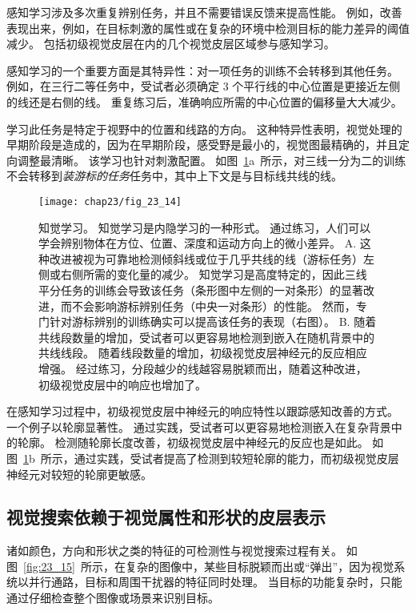 感知学习涉及多次重复辨别任务，并且不需要错误反馈来提高性能。
例如，改善表现出来，例如，在目标刺激的属性或在复杂的环境中检测目标的能力差异的阈值减少。
包括初级视觉皮层在内的几个视觉皮层区域参与感知学习。


感知学习的一个重要方面是其特异性：对一项任务的训练不会转移到其他任务。
例如，在三行二等任务中，受试者必须确定 3 个平行线的中心位置是更接近左侧的线还是右侧的线。
重复练习后，准确响应所需的中心位置的偏移量大大减少。


学习此任务是特定于视野中的位置和线路的方向。
这种特异性表明，视觉处理的早期阶段是造成的，因为在早期阶段，感受野是最小的，视觉图最精确的，并且定向调整最清晰。
该学习也针对刺激配置。
如图~\ref{fig:23_14}a~所示，对三线一分为二的训练不会转移到\textit{装游标的任务}任务中，其中上下文是与目标线共线的线。


\begin{figure}[htbp]
	\centering
	\texttt{[image: chap23/fig\_23\_14]}
	\caption{知觉学习。
		知觉学习是内隐学习的一种形式。
		通过练习，人们可以学会辨别物体在方位、位置、深度和运动方向上的微小差异。
		A. 这种改进被视为可靠地检测倾斜线或位于几乎共线的线（游标任务）左侧或右侧所需的变化量的减少。
		知觉学习是高度特定的，因此三线平分任务的训练会导致该任务（条形图中左侧的一对条形）的显著改进，而不会影响游标辨别任务（中央一对条形）的性能。
		然而，专门针对游标辨别的训练确实可以提高该任务的表现（右图）。
		B. 随着共线段数量的增加，受试者可以更容易地检测到嵌入在随机背景中的共线线段。
		随着线段数量的增加，初级视觉皮层神经元的反应相应增强。
		经过练习，分段越少的线越容易脱颖而出，随着这种改进，初级视觉皮层中的响应也增加了\cite{crist2001learning,li2008learning}。}
	\label{fig:23_14}
\end{figure}


在感知学习过程中，初级视觉皮层中神经元的响应特性以跟踪感知改善的方式。
一个例子以轮廓显著性。
通过实践，受试者可以更容易地检测嵌入在复杂背景中的轮廓。
检测随轮廓长度改善，初级视觉皮层中神经元的反应也是如此。
如图~\ref{fig:23_14}b~所示，通过实践，受试者提高了检测到较短轮廓的能力，而初级视觉皮层神经元对较短的轮廓更敏感。



\subsection{视觉搜索依赖于视觉属性和形状的皮层表示}

诸如颜色，方向和形状之类的特征的可检测性与视觉搜索过程有关。
如图~\ref{fig:23_15}~所示，在复杂的图像中，某些目标脱颖而出或“弹出”，因为视觉系统以并行通路，目标和周围干扰器的特征同时处理。
当目标的功能复杂时，只能通过仔细检查整个图像或场景来识别目标。


